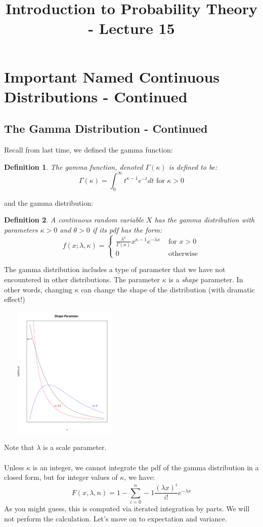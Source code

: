 \documentclass[12pt]{article} %
\date{}
\title{Introduction to Probability Theory - Lecture 15}
\newtheorem{defn}{Definition}
\begin{document}
\maketitle

\section{Important Named Continuous Distributions - Continued}
\subsection{The Gamma Distribution - Continued}
Recall from last time, we defined the gamma function: 
\begin{defn}
The gamma function, denoted $\Gamma(\kappa)$ is defined to be:
$$\Gamma(\kappa) = \int_0^{\infty} t^{\kappa -1} e^{-t} dt \textrm{ for } \kappa >0$$
\end{defn}
and the gamma distribution:
\begin{defn}
A continuous random variable $X$ has the gamma distribution with parameters $\kappa>0$ and $\theta>0$ if its pdf has the form:
$$f(x;\lambda,\kappa) = \left\{\begin{matrix}
\frac{\lambda^\kappa}{\Gamma(\kappa)}x^{\kappa-1} e^{-\lambda x} & \textrm{ for } x>0\\0&\textrm{ otherwise}\end{matrix}\right.$$
\end{defn}
The gamma distribution includes a type of parameter that we have not encountered in other distributions. The parameter $\kappa$ is a \emph{shape} parameter. In other words, changing $\kappa$ can change the shape of the distribution (with dramatic effect!)

\includegraphics[height=2.5in,width=2.5in]{shape.pdf}

Note that $\lambda$ is a scale parameter.\\\\
Unless $\kappa$ is an integer, we cannot integrate the pdf of the gamma distribution in a closed form, but for integer values of $\kappa$, we have:
$$F(x,\lambda,n) = 1-\sum_{i=0}^n-1 \frac{\left(\lambda x\right)^i}{i!} e^{-\lambda x}$$
As you might guess, this is computed via iterated integration by parts. We will not perform the calculation. Let's move on to expectation and variance.
\end{document}
